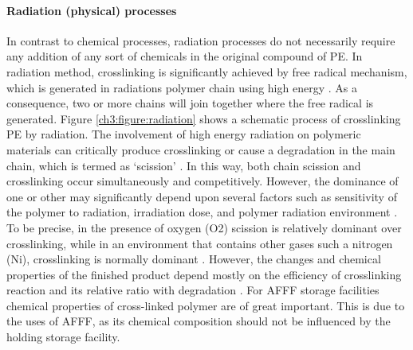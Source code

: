 \documentclass[12pt]{report}
\begin{document}
\paragraph{Radiation (physical) processes}
In contrast to chemical processes, radiation processes do not necessarily require any addition of any sort of chemicals in the original compound of PE. In radiation method, crosslinking is significantly achieved by free radical mechanism, which is generated in radiations polymer chain using high energy \cite{meola2005cross}. As a consequence, two or more chains will join together where the free radical is generated. Figure \ref{ch3:figure:radiation} shows a schematic process of crosslinking PE by radiation. 
The involvement of high energy radiation on polymeric materials can critically produce crosslinking or cause a degradation in the main chain, which is termed as ‘scission’ \cite{meola2005cross}. In this way, both chain scission and crosslinking occur simultaneously and competitively. However, the dominance of one or other may significantly depend upon several factors such as sensitivity of the polymer to radiation, irradiation dose, and polymer radiation environment \cite{meola2005cross}. To be precise, in the presence of oxygen (O2) scission is relatively dominant over crosslinking, while in an environment that contains other gases such a nitrogen (Ni), crosslinking is normally dominant \cite{meola2005cross}. However, the changes and chemical properties of the finished product depend mostly on the efficiency of crosslinking reaction and its relative ratio with degradation \cite{meola2005cross}. For AFFF storage facilities chemical properties of cross-linked polymer are of great important. This is due to the uses of AFFF, as its chemical composition should not be influenced by the holding storage facility.
\end{document}
